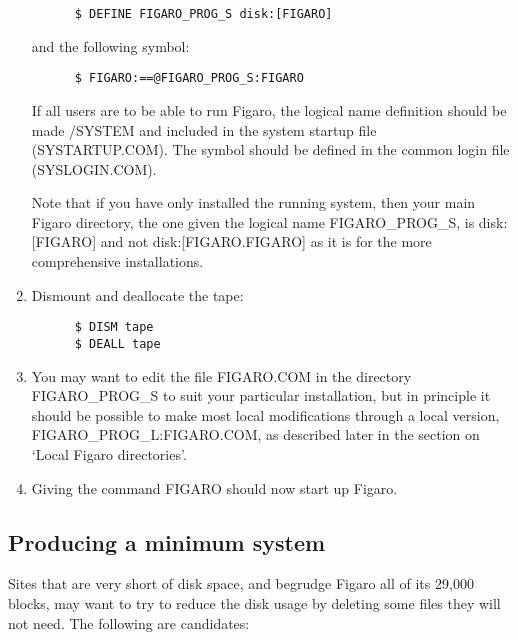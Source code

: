 \begin{enumerate}
\begin{verbatim}
      $ DEFINE FIGARO_PROG_S disk:[FIGARO]
\end{verbatim}
and the following symbol:
\begin{verbatim}
      $ FIGARO:==@FIGARO_PROG_S:FIGARO
\end{verbatim}

If all users are to be able to run Figaro, the logical name definition  should
be made /SYSTEM and included in the system startup file (SYSTARTUP.COM).  The
symbol should be defined in the common login file (SYSLOGIN.COM).

Note that if you have only installed the running system, then your main  Figaro
directory, the one given the logical name FIGARO\_PROG\_S, is disk:[FIGARO] and
not disk:[FIGARO.FIGARO] as it is for the more comprehensive installations.

\item Dismount and deallocate the tape:

\begin{verbatim}
      $ DISM tape
      $ DEALL tape
\end{verbatim}

\item You may want to edit the file FIGARO.COM in the directory FIGARO\_PROG\_S
to suit your particular installation, but in principle it should be possible to
make most local modifications through  a local version,
FIGARO\_PROG\_L:FIGARO.COM, as described later in the section on `Local Figaro
directories'.

\item Giving the command FIGARO should now start up Figaro.

\end{enumerate}

\subsection{Producing a minimum system}

Sites that are very short of disk space, and begrudge Figaro all of its  29,000
blocks, may want to try to reduce the disk usage by deleting some files they
will not need. The following are candidates:

